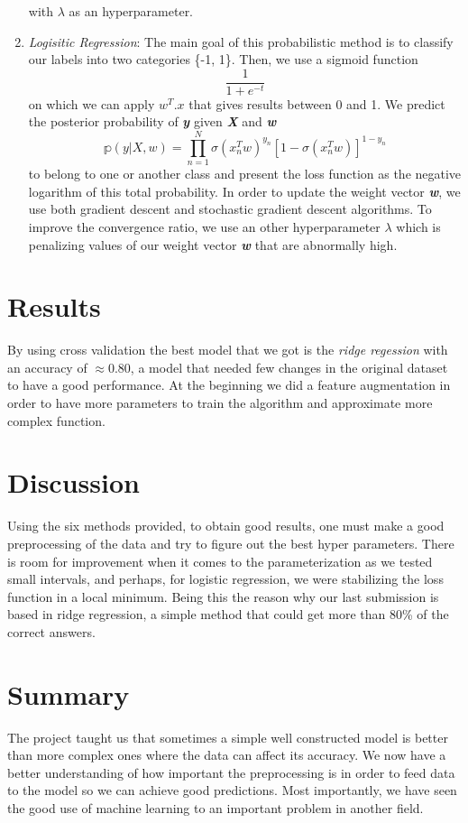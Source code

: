 \documentclass[10pt,conference,compsocconf]{IEEEtran}
\begin{document}
\begin{enumerate}
 with \( \lambda \) as an hyperparameter.
 \item \textit{Logisitic Regression}:
The main goal of this probabilistic method is to classify our labels into two categories \{-1, 1\}.
Then, we use a sigmoid function \begin{equation} \frac{1}{1+e^{-t}} \end{equation} on which we can apply \( w^{T}.x \) that gives results between 0 and 1.
We predict the posterior probability of \textbf{\textit{y}} given \textbf{\textit{X}} and \textbf{\textit{w}} 
\begin{equation}
    \mathbb{p}(y|X,w) = \prod_{n=1}^{N} \sigma(x^{T}_{n}w)^{y_{n}}[1 - \sigma(x^{T}_{n}w)]^{1 - y_{n}}
\end{equation}
to belong to one or another class and present the loss function as the negative logarithm of this total probability.
In order to update the weight vector \textbf{\textit{w}},  we use both gradient descent and stochastic gradient descent algorithms.
To improve the convergence ratio, we use an other hyperparameter \( \lambda \)  which is  penalizing values of our weight vector \textbf{\textit{w}} that are abnormally high. 
 \end{enumerate}
\section{Results}
By using cross validation the best model that we got is the \textit{ridge regession} with an accuracy of $\approx 0.80$, a model that needed few changes in the original dataset to have a good performance. At the beginning we did a feature augmentation in order to have more parameters to train the algorithm and approximate more complex function.

\section{Discussion}
Using the six methods provided, to obtain good results, one must make a good preprocessing of the data and try to figure out the best hyper parameters. There is room for improvement when it comes to the parameterization as we tested small intervals, and perhaps, for logistic regression, we were stabilizing the loss function in a local minimum. Being this the reason why our last submission is based in ridge regression, a simple method that could get more than 80\% of the correct answers.

\section{Summary}
The project taught us that sometimes a simple well constructed model is better than more complex ones where the data can affect its accuracy. We now have a better understanding of how important the preprocessing is in order to feed data to the model so we can achieve good predictions. Most importantly, we have seen the good use of machine learning to an important problem in another field.
\end{document}
